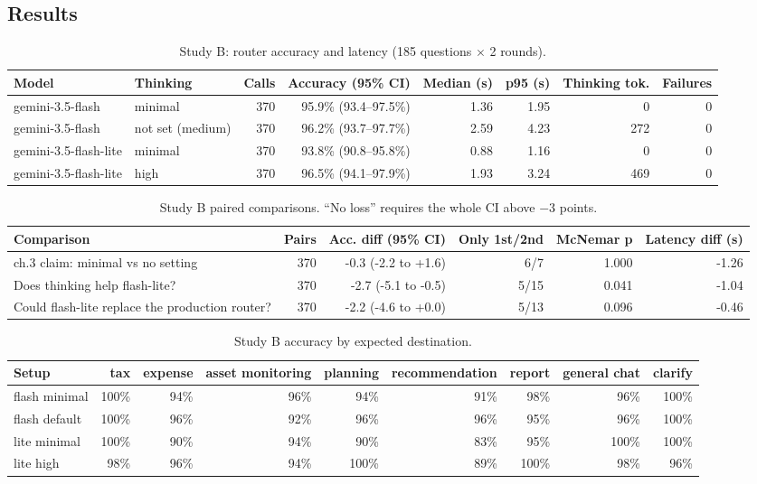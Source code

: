 \documentclass[11pt,a4paper]{article}
\begin{document}
\subsection{Results}
\begin{table}[H]
\centering
\footnotesize
\caption{Study B: router accuracy and latency (185 questions $\times$ 2 rounds).}\label{tab:b-setups}
\begin{tabular}{llrrrrrr}
\toprule
\textbf{Model} & \textbf{Thinking} & \textbf{Calls} & \textbf{Accuracy (95\% CI)} & \textbf{Median (s)} & \textbf{p95 (s)} & \textbf{Thinking tok.} & \textbf{Failures} \\
\midrule
gemini-3.5-flash & minimal & 370 & 95.9\% (93.4--97.5\%) & 1.36 & 1.95 & 0 & 0 \\
gemini-3.5-flash & not set (medium) & 370 & 96.2\% (93.7--97.7\%) & 2.59 & 4.23 & 272 & 0 \\
gemini-3.5-flash-lite & minimal & 370 & 93.8\% (90.8--95.8\%) & 0.88 & 1.16 & 0 & 0 \\
gemini-3.5-flash-lite & high & 370 & 96.5\% (94.1--97.9\%) & 1.93 & 3.24 & 469 & 0 \\
\bottomrule
\end{tabular}
\end{table}
\begin{table}[H]
\centering
\footnotesize
\caption{Study B paired comparisons. ``No loss'' requires the whole CI above $-3$ points.}\label{tab:b-comp}
\begin{tabular}{p{4.3cm}rrrrr}
\toprule
\textbf{Comparison} & \textbf{Pairs} & \textbf{Acc. diff (95\% CI)} & \textbf{Only 1st/2nd} & \textbf{McNemar p} & \textbf{Latency diff (s)} \\
\midrule
ch.3 claim: minimal vs no setting & 370 & -0.3 (-2.2 to +1.6) & 6/7 & 1.000 & -1.26 \\
Does thinking help flash-lite? & 370 & -2.7 (-5.1 to -0.5) & 5/15 & 0.041 & -1.04 \\
Could flash-lite replace the production router? & 370 & -2.2 (-4.6 to +0.0) & 5/13 & 0.096 & -0.46 \\
\bottomrule
\end{tabular}
\end{table}
\begin{table}[H]
\centering
\scriptsize
\caption{Study B accuracy by expected destination.}\label{tab:b-dest}
\begin{tabular}{lrrrrrrrr}
\toprule
\textbf{Setup} & \textbf{tax} & \textbf{expense} & \textbf{asset \allowbreak{}monitoring} & \textbf{planning} & \textbf{recommendation} & \textbf{report} & \textbf{general \allowbreak{}chat} & \textbf{clarify} \\
\midrule
flash minimal & 100\% & 94\% & 96\% & 94\% & 91\% & 98\% & 96\% & 100\% \\
flash default & 100\% & 96\% & 92\% & 96\% & 96\% & 95\% & 96\% & 100\% \\
lite minimal & 100\% & 90\% & 94\% & 90\% & 83\% & 95\% & 100\% & 100\% \\
lite high & 98\% & 96\% & 94\% & 100\% & 89\% & 100\% & 98\% & 96\% \\
\bottomrule
\end{tabular}
\end{table}
\end{document}
